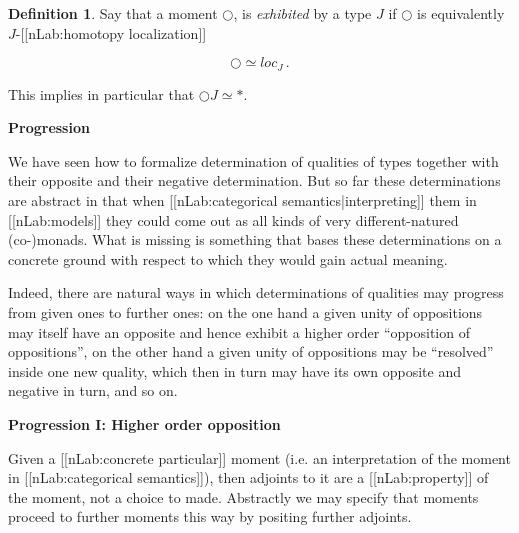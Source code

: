 \documentclass[12pt,titlepage]{article}
\theoremstyle{plain}
\theoremstyle{definition}
\newtheorem{defn}{Definition}
\theoremstyle{remark}
\begin{document}
\begin{defn}
\label{Localization}\hypertarget{Localization}{}
Say that a moment $\bigcirc$, is \emph{exhibited} by a type $J$ if $\bigcirc$ is equivalently $J$-[[nLab:homotopy localization]]

\begin{displaymath}
\bigcirc \simeq loc_{J}
  \,.
\end{displaymath}
\end{defn}
This implies in particular that $\bigcirc J \simeq \ast$.

\textbf{Progression}

We have seen how to formalize determination of qualities of types together with their opposite and their negative determination. But so far these determinations are abstract in that when [[nLab:categorical semantics|interpreting]] them in [[nLab:models]] they could come out as all kinds of very different-natured (co-)monads. What is missing is something that bases these determinations on a concrete ground with respect to which they would gain actual meaning.

Indeed, there are natural ways in which determinations of qualities may progress from given ones to further ones: on the one hand a given unity of oppositions may itself have an opposite and hence exhibit a higher order ``opposition of oppositions'', on the other hand a given unity of oppositions may be ``resolved'' inside one new quality, which then in turn may have its own opposite and negative in turn, and so on.

\textbf{Progression I: Higher order opposition}

Given a [[nLab:concrete particular]] moment (i.e. an interpretation of the moment in [[nLab:categorical semantics]]), then adjoints to it are a [[nLab:property]] of the moment, not a choice to made. Abstractly we may specify that moments proceed to further moments this way by positing further adjoints.
\end{document}
